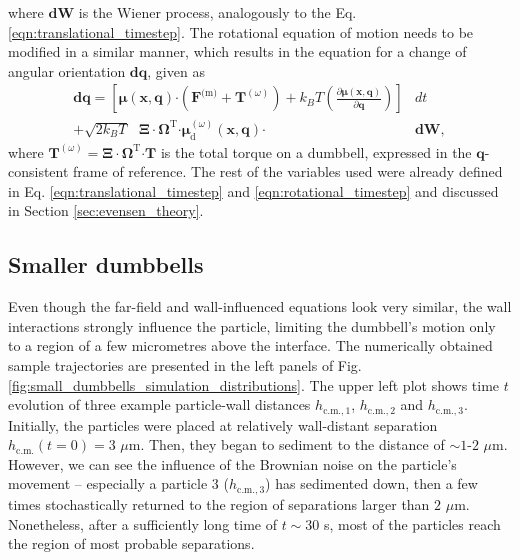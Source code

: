 \documentclass{master_thesis}
\begin{document}
where $\boldsymbol{dW}$ is the Wiener process, analogously to the Eq. \eqref{eqn:translational_timestep}. The rotational equation of motion needs to be modified in a similar manner, which results in the equation for a change of angular orientation $\boldsymbol{dq}$, given as
\begin{equation}
    \begin{split}
    \boldsymbol{dq} = \left[\bm{\mu}(\boldsymbol{x}, \boldsymbol{q}) \bm{\cdot} \left( \boldsymbol{F}^{\textrm{(m)}} + \boldsymbol{T}^{(\omega)} \right)  + k_BT\left( \frac{\partial\bm{\mu}(\boldsymbol{x}, \boldsymbol{q})}{\partial\boldsymbol{q}} \right) \right]& dt\\
    +\sqrt{2k_BT} \textrm{ } \bm{\Xi \cdot \Omega}^\textrm{T} \bm{\cdot \mu}^{(\omega)}_{\textrm{d}}(\boldsymbol{x}, \boldsymbol{q}) \bm{\cdot} &\boldsymbol{dW},
    \end{split}
\label{eqn:wall_influenced_rotation}
\end{equation}
where $\boldsymbol{T}^{(\omega)} = \bm{\Xi \cdot \Omega}^\textrm{T} \bm{\cdot} \boldsymbol{T}$ is the total torque on a dumbbell, expressed in the $\boldsymbol{q}$-consistent frame of reference. The rest of the variables used were already defined in Eq. \eqref{eqn:translational_timestep} and \eqref{eqn:rotational_timestep} and discussed in Section \ref{sec:evensen_theory}.

\subsection{Smaller dumbbells}

Even though the far-field and wall-influenced equations look very similar, the wall interactions strongly influence the particle, limiting the dumbbell's motion only to a region of a few micrometres above the interface. The numerically obtained sample trajectories are presented in the left panels of Fig. \ref{fig:small_dumbbells_simulation_distributions}. The upper left plot shows time $t$ evolution of three example particle-wall distances $h_{\textrm{c.m.},1}$, $h_{\textrm{c.m.},2}$ and $h_{\textrm{c.m.},3}$. Initially, the particles were placed at relatively wall-distant separation $h_{\textrm{c.m.}}(t=0) = 3$ $\mu$m. Then, they began to sediment to the distance of $\sim 1$-$2$ $\mu$m. However, we can see the influence of the Brownian noise on the particle's movement -- especially a particle 3 ($h_{\textrm{c.m.},3}$) has sedimented down, then a few times stochastically returned to the region of separations larger than $2$ $\mu$m. Nonetheless, after a sufficiently long time of $t \sim 30$ s, most of the particles reach the region of most probable separations. 
\end{document}
